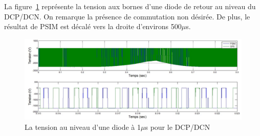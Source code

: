 \documentclass[11pt,letterpaper,final]{report}
\begin{document}
La figure~\ref{AF_DC_HV1} représente la tension aux bornes d'une diode de retour au niveau du DCP/DCN. On remarque la présence de commutation non désirée. De plus, le résultat de PSIM est décalé vers la droite d'environs 500$\mu$s.

\begin{figure}[htb]
\centering
\includegraphics[scale=0.5]{Fig/DCP_AFE/1u/hash_diode.jpg}
\caption{La tension au niveau d'une diode à 1$\mu$s pour le DCP/DCN}
\label{AF_DC_HV1}
\end{figure}
\end{document}
